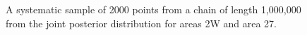  \begin{figure}[!tbp]
	\centering
	\\
	\\
	\caption{A systematic sample of 2000 points from a chain of length 1,000,000 from the joint posterior distribution for areas 2W and area 27.}\label{Results:Minor:mcmcTrace}
\end{figure}

